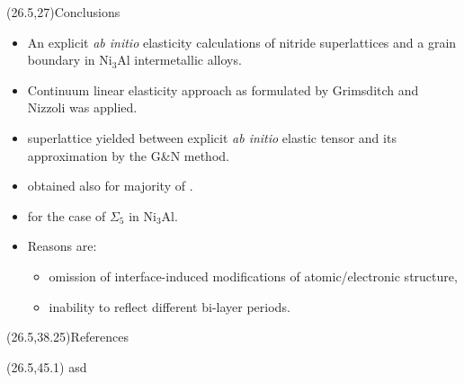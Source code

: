 \documentclass{mul_poster}
\begin{document}
(26.5,27){Conclusions}{
  \vspace*{-3mm}
  \begin{itemize}
    \item An explicit \alert{\textit{ab initio} elasticity} calculations of nitride \alert{superlattices and a grain boundary} in Ni$_3$Al intermetallic alloys.
    \item Continuum linear elasticity approach as formulated by \alert{Grimsditch and Nizzoli} was applied.\bigskip
    \item {} superlattice yielded  between explicit \textit{ab initio} elastic tensor and its approximation by the G\&N method.
    \item {} obtained also for majority of .
    \item {} for the case of $\Sigma_5$  in Ni$_3$Al.\bigskip
    \item Reasons are:
      \begin{itemize}
        \item omission of \alert{interface-induced modifications of atomic/electronic structure},
        \item inability to reflect different \alert{bi-layer periods}.
      \end{itemize}
  \end{itemize}
}

(26.5,38.25){References}{
  \let\oldbibliography\thebibliography
  \renewcommand{\thebibliography}[1]{\oldbibliography{#1}
  \setlength{\itemsep}{0pt}} 
  
  \small
}  

(26.5,45.1){}{
  \footnotesize
  asd
}
\end{document}
